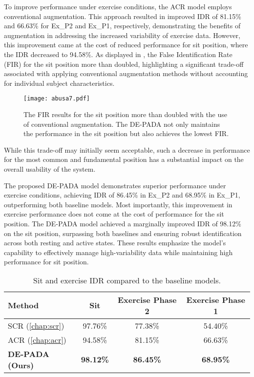 To improve performance under exercise conditions, the ACR model employs conventional augmentation.
This approach resulted in improved IDR of 81.15\% and 66.63\% for Ex\_P2 and Ex\_P1, respectively, demonstrating the benefits of augmentation in addressing the increased variability of exercise data.
However, this improvement came at the cost of reduced performance for sit position, where the IDR decreased to 94.58\%.
As displayed in , the False Identification Rate (FIR) for the sit position more than doubled, highlighting a significant trade-off associated with applying conventional augmentation methods without accounting for individual subject characteristics.
\begin{figure}[!t]
\centering
\texttt{[image: abusa7.pdf]}
\caption[FIR on sit position]{The FIR results for the sit position more than doubled with the use of conventional augmentation. The DE-PADA not only maintains the performance in the sit position but also achieves the lowest FIR.}
\label{fig:sit_error_final}
\end{figure}

While this trade-off may initially seem acceptable, such a decrease in performance for the most common and fundamental position has a substantial impact on the overall usability of the system.

The proposed DE-PADA model demonstrates superior performance under exercise conditions, achieving IDR of 86.45\% in Ex\_P2 and 68.95\% in Ex\_P1, outperforming both baseline models.
Most importantly, this improvement in exercise performance does not come at the cost of performance for the sit position.
The DE-PADA model achieved a marginally improved IDR of 98.12\% on the sit position, surpassing both baselines and ensuring robust identification across both resting and active states.
These results emphasize the model’s capability to effectively manage high-variability data while maintaining high performance for sit position.

\begin{table}[!t]
    \centering
    \caption[Performance on sit position and exercise conditions]{Sit and exercise IDR compared to the baseline models.}
    \label{tab:aug_baseline_performance}
    \begin{tabular}{lccc}
        \hline
        Method                   & Sit              & Exercise Phase 2  & Exercise Phase 1  \\
        \hline
        SCR (\ref{chap:scr})                     & 97.76\%          & 77.38\%           & 54.40\%           \\
        ACR (\ref{chap:acr})                     & 94.58\%          & 81.15\%           & 66.63\%           \\
        \textbf{DE-PADA (Ours)}  & \textbf{98.12\%} & \textbf{86.45\%}  & \textbf{68.95\%}  \\
        \hline
    \end{tabular}%
\end{table}

